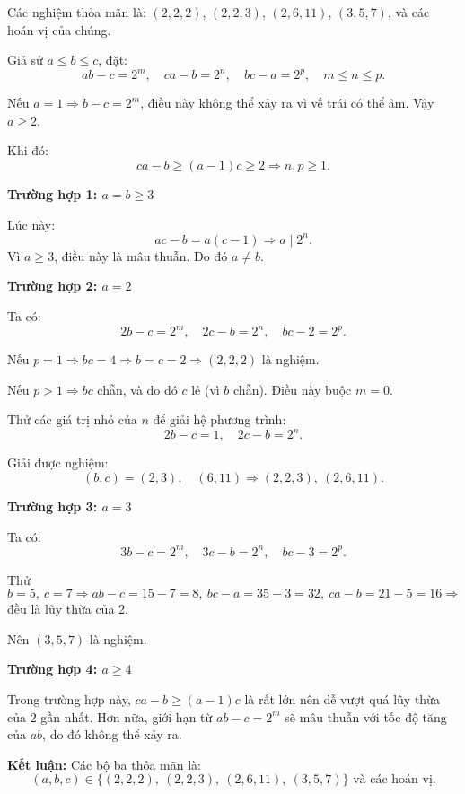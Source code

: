 \documentclass[../06-largest-exponent.tex]{subfiles}
\begin{document}
\begin{soln}\footnotemark
	Các nghiệm thỏa mãn là: \( (2,2,2) \), \( (2,2,3) \), \( (2,6,11) \), \( (3,5,7) \), và các hoán vị của chúng.

	Giả sử \( a \le b \le c \), đặt:
	\[
		ab - c = 2^m,\quad ca - b = 2^n,\quad bc - a = 2^p,\quad m \le n \le p.
	\]

	Nếu \( a = 1 \Rightarrow b - c = 2^m \), điều này không thể xảy ra vì vế trái có thể âm. Vậy \( a \ge 2 \).

	Khi đó:
	\[
		ca - b \ge (a - 1)c \ge 2 \Rightarrow n, p \ge 1.
	\]

	\textbf{Trường hợp 1: \( a = b \ge 3 \)}

	Lúc này:
	\[
		ac - b = a(c - 1) \Rightarrow a \mid 2^n.
	\]
	Vì \( a \ge 3 \), điều này là mâu thuẫn. Do đó \( a \ne b \).

	\textbf{Trường hợp 2: \( a = 2 \)}

	Ta có:
	\[
		2b - c = 2^m,\quad 2c - b = 2^n,\quad bc - 2 = 2^p.
	\]

	Nếu \( p = 1 \Rightarrow bc = 4 \Rightarrow b = c = 2 \Rightarrow (2,2,2) \) là nghiệm.

	Nếu \( p > 1 \Rightarrow bc \) chẵn, và do đó \( c \) lẻ (vì \( b \) chẵn). Điều này buộc \( m = 0 \).

	Thử các giá trị nhỏ của \( n \) để giải hệ phương trình:
	\[
		2b - c = 1,\quad 2c - b = 2^n.
	\]

	Giải được nghiệm:
	\[
		(b,c) = (2,3),\quad (6,11) \Rightarrow (2,2,3),\ (2,6,11).
	\]

	\textbf{Trường hợp 3: \( a = 3 \)}

	Ta có:
	\[
		3b - c = 2^m,\quad 3c - b = 2^n,\quad bc - 3 = 2^p.
	\]

	Thử \( b = 5,\ c = 7 \Rightarrow ab - c = 15 - 7 = 8,\ bc - a = 35 - 3 = 32,\ ca - b = 21 - 5 = 16 \Rightarrow \) đều là lũy thừa của 2.

	Nên \( (3,5,7) \) là nghiệm.

	\textbf{Trường hợp 4: \( a \ge 4 \)}

	Trong trường hợp này, \( ca - b \ge (a - 1)c \) là rất lớn nên dễ vượt quá lũy thừa của 2 gần nhất.  
	Hơn nữa, giới hạn từ \( ab - c = 2^m \) sẽ mâu thuẫn với tốc độ tăng của \( ab \), do đó không thể xảy ra.

	\textbf{Kết luận:} Các bộ ba thỏa mãn là:
	\[
		\boxed{(a, b, c) \in \{ (2,2,2),\ (2,2,3),\ (2,6,11),\ (3,5,7) \} \text{ và các hoán vị.}}
	\]
\end{soln}

\end{document}
